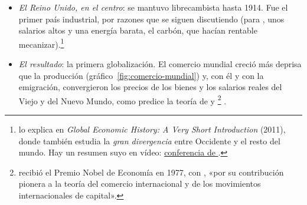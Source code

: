 \documentclass[11pt]{article}
\begin{document}
\begin{itemize}
\begin{itemize}
  \end{itemize}
\item \emph{El Reino Unido, en el centro}: se mantuvo librecambista hasta 1914. Fue el primer país industrial, por razones que se siguen discutiendo (para , unos salarios altos y una energía barata, el carbón, que hacían rentable mecanizar).\footnote{ lo explica en \emph{Global Economic History: A Very Short Introduction} (2011), donde también estudia la \emph{gran divergencia} entre Occidente y el resto del mundo. Hay un resumen suyo en vídeo: \href{https://youtu.be/iSJePQZRsSs?t=675}{conferencia de }.}
\item \emph{El resultado}: la primera globalización. El comercio mundial creció más deprisa que la producción (gráfico~\ref{fig:comercio-mundial}) y, con él y con la emigración, convergieron los precios de los bienes y los salarios reales del Viejo y del Nuevo Mundo, como predice la teoría de  y \footnote{ recibió el Premio Nobel de Economía en 1977, con , «por su contribución pionera a la teoría del comercio internacional y de los movimientos internacionales de capital»\nocite{Nobel1977MeadeOhlin}.}\nocite{ORourkeWilliamson1999Globalization}  .
\end{itemize}
\end{document}
